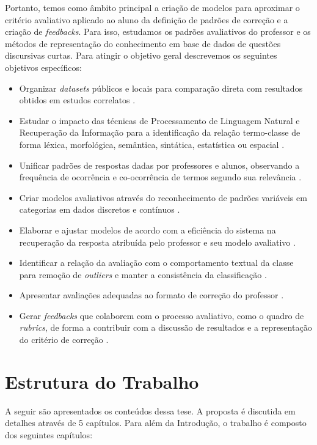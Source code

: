Portanto, temos como âmbito principal a criação de modelos para aproximar o critério avaliativo aplicado ao aluno da definição de padrões de correção e a criação de \textit{feedbacks}. Para isso, estudamos os padrões avaliativos do professor e os métodos de representação do conhecimento em base de dados de questões discursivas curtas. Para atingir o objetivo geral descrevemos os seguintes objetivos específicos:

\begin{itemize}
\item Organizar \textit{datasets} públicos e locais para comparação direta com resultados obtidos em estudos correlatos \cite{burrows2015}.
\item Estudar o impacto das técnicas de Processamento de Linguagem Natural e Recuperação da Informação para a identificação da relação termo-classe de forma léxica, morfológica, semântica, sintática, estatística ou espacial \cite{burrows2015, butcher2010}.
\item Unificar padrões de respostas dadas por professores e alunos, observando a frequência de ocorrência e co-ocorrência de termos segundo sua relevância \cite{butcher2010}.
\item Criar modelos avaliativos através do reconhecimento de padrões variáveis em categorias em dados discretos e contínuos \cite{burrows2015}.
\item Elaborar e ajustar modelos de acordo com a eficiência do sistema na recuperação da resposta atribuída pelo professor e seu modelo avaliativo \cite{burrows2015}.
\item Identificar a relação da avaliação com o comportamento textual da classe para remoção de \textit{outliers} e manter a consistência da classificação \cite{butcher2010}.
\item Apresentar avaliações adequadas ao formato de correção do professor \cite{butcher2010}.
\item Gerar \textit{feedbacks} que colaborem com o processo avaliativo, como o quadro de \textit{rubrics}, de forma a contribuir com a discussão de resultados e a representação do critério de correção \cite{oliveira2010}.
\end{itemize}

\section{Estrutura do Trabalho}

A seguir são apresentados os conteúdos dessa tese. A proposta é discutida em detalhes através de 5 capítulos. Para além da Introdução, o trabalho é composto dos seguintes capítulos:

